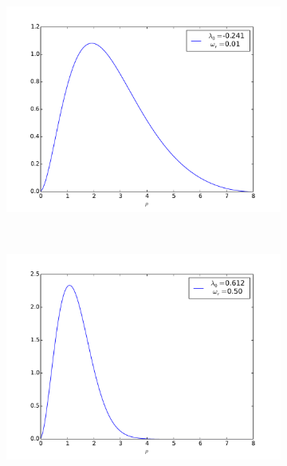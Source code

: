\documentclass[11pt, a4paper]{article}
\begin{document}
			\begin{figure}
				\centering
   				\begin{subfigure}[b]{0.45\textwidth}
					\includegraphics[width=1.1\textwidth]{plot-twoElectrons_01}
				\end{subfigure}
				~ %
				\begin{subfigure}[b]{0.45\textwidth}
					\includegraphics[width=1.1\textwidth]{plot-twoElectrons_05}
				\end{subfigure}
				\begin{subfigure}[b]{0.45\textwidth}

\end{subfigure}
\end{figure}
\end{document}
